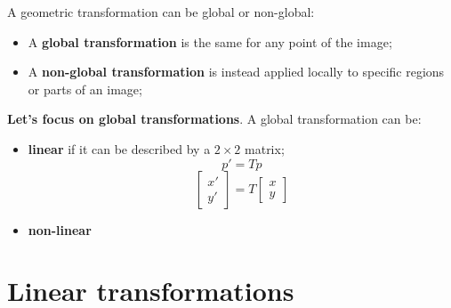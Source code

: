 \documentclass{article}
\begin{document}
A geometric transformation can be global or non-global:
\begin{itemize}
    \item A \textbf{global transformation} is the same for any point of the image;
    \item A \textbf{non-global transformation} is instead applied locally to specific regions or parts of an image;
\end{itemize}

\textbf{Let's focus on global transformations}. A global transformation can be:
\begin{itemize}
    \item \textbf{linear} if it can be described by a $2\times 2$ matrix;
    \begin{equation*}
        p' = Tp
    \end{equation*}
    \begin{equation*}
        \begin{bmatrix}
            x' \\ y'
        \end{bmatrix}
        = T \begin{bmatrix}
            x \\ y
        \end{bmatrix}
    \end{equation*}
    \item \textbf{non-linear}
\end{itemize}

\newpage

\section*{Linear transformations}
\end{document}
